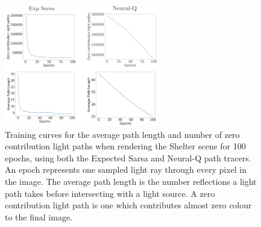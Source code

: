 \documentclass[../dissertation.tex]{subfiles}
\begin{document}
\begin{figure}[h]
\begin{center}
\includegraphics[width=0.6\textwidth]{images/training_curves.png}    
\end{center}
\caption{Training curves for the average path length and number of zero contribution light paths when rendering the Shelter scene for 100 epochs, using both the Expected Sarsa and Neural-Q path tracers. An epoch represents one sampled light ray through every pixel in the image. The average path length is the number reflections a light path takes before intersecting with a light source. A zero contribution light path is one which contributes almost zero colour to the final image.}
\label{fig:training_curves_archway}
\end{figure}
\end{document}
